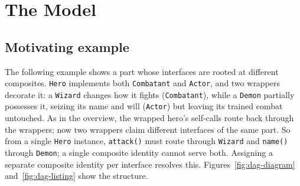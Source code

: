 \documentclass[sigplan,10pt,review,anonymous]{acmart}
\theoremstyle{acmplain}
\newcommand{\code}[1]{\texttt{#1}}
\begin{document}
\section{The Model}
\label{sec:model}

\subsection*{Motivating example}

The following example shows a part whose interfaces are rooted at different
composites. \code{Hero} implements both \code{Combatant} and \code{Actor},
and two wrappers decorate it: a \code{Wizard} changes how it fights
(\code{Combatant}), while a \code{Demon} partially possesses it, seizing its name
and will (\code{Actor}) but leaving its trained combat untouched. As in the
overview, the wrapped hero's self-calls route back through the wrappers; now two
wrappers claim different interfaces of the same part. So from a single \code{Hero}
instance, \code{attack()} must route through \code{Wizard} and \code{name()}
through \code{Demon}; a single composite identity cannot serve both. Assigning a
separate composite identity per interface resolves this.
Figures~\ref{fig:dag-diagram} and~\ref{fig:dag-listing} show the structure.
\end{document}
